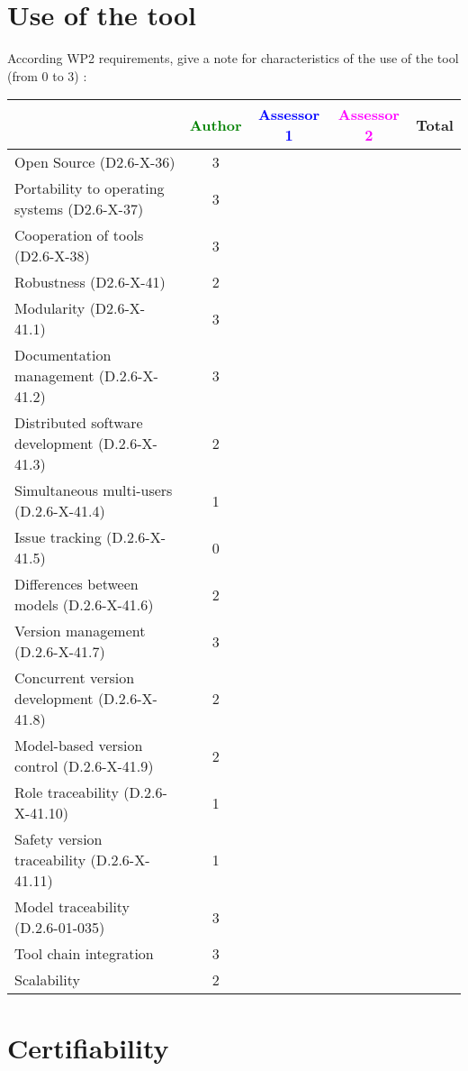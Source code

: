 \section{Use of the tool}


According WP2 requirements, give a note for characteristics of the use of the tool (from 0 to 3) :

\begin{tabular}{|l | c | c | c | c|}
\hline
& \textcolor{green}{Author} & \textcolor{blue}{Assessor 1} & \textcolor{magenta}{Assessor 2} & Total \\
\hline 
Open Source (D2.6-X-36) & 3 & & &  \\
\hline 
Portability to operating systems (D2.6-X-37) & 3 & & &  \\
\hline
Cooperation of tools (D2.6-X-38) & 3 & & &  \\
\hline
Robustness (D2.6-X-41) & 2 & & & \\
\hline
Modularity (D2.6-X-41.1) & 3 & & & \\
\hline
Documentation management (D.2.6-X-41.2) & 3 & & & \\
\hline
Distributed software development (D.2.6-X-41.3)  & 2 & & & \\
\hline
Simultaneous multi-users (D.2.6-X-41.4)   & 1 & & & \\
\hline
Issue tracking (D.2.6-X-41.5) & 0 & & & \\
\hline
Differences between models (D.2.6-X-41.6) & 2 & & & \\
\hline
Version management (D.2.6-X-41.7) & 3 & & & \\
\hline
Concurrent version development (D.2.6-X-41.8) & 2 & & & \\
\hline
Model-based version control (D.2.6-X-41.9) & 2 & & & \\
\hline
Role traceability (D.2.6-X-41.10) & 1 & & & \\
\hline
Safety version traceability (D.2.6-X-41.11) & 1 & & & \\
\hline
Model traceability (D.2.6-01-035) & 3 & & & \\
\hline
Tool chain integration & 3 & & & \\
\hline
Scalability & 2 & & & \\
\hline
\end{tabular}

\section{Certifiability}

